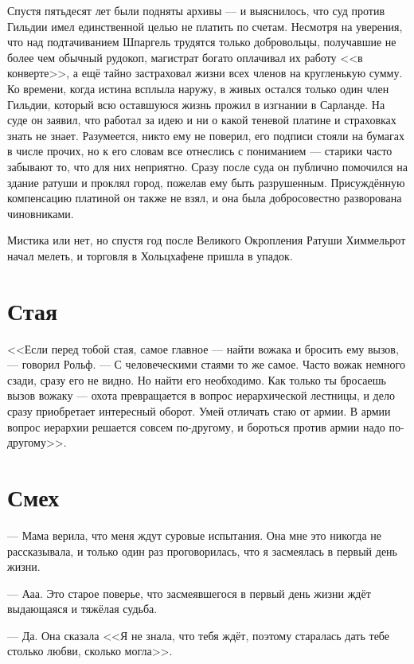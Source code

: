 Спустя пятьдесят лет были подняты архивы --- и выяснилось, что суд против Гильдии имел единственной целью не платить по счетам.
Несмотря на уверения, что над подтачиванием Шпаргель трудятся только добровольцы, получавшие не более чем обычный рудокоп, магистрат богато оплачивал их работу <<в конверте>>, а ещё тайно застраховал жизни всех членов на кругленькую сумму.
Ко времени, когда истина всплыла наружу, в живых остался только один член Гильдии, который всю оставшуюся жизнь прожил в изгнании в Сарланде.
На суде он заявил, что работал за идею и ни о какой теневой платине и страховках знать не знает.
Разумеется, никто ему не поверил, его подписи стояли на бумагах в числе прочих, но к его словам все отнеслись с пониманием --- старики часто забывают то, что для них неприятно.
Сразу после суда он публично помочился на здание ратуши и проклял город, пожелав ему быть разрушенным.
Присуждённую компенсацию платиной он также не взял, и она была добросовестно разворована чиновниками.

Мистика или нет, но спустя год после Великого Окропления Ратуши Химмельрот начал мелеть, и торговля в Хольцхафене пришла в упадок.

\section{Стая}

<<Если перед тобой стая, самое главное --- найти вожака и бросить ему вызов, --- говорил Рольф.
--- С человеческими стаями то же самое.
Часто вожак немного сзади, сразу его не видно.
Но найти его необходимо.
Как только ты бросаешь вызов вожаку --- охота превращается в вопрос иерархической лестницы, и дело сразу приобретает интересный оборот.
Умей отличать стаю от армии.
В армии вопрос иерархии решается совсем по-другому, и бороться против армии надо по-другому>>.

\section{Смех}

--- Мама верила, что меня ждут суровые испытания.
Она мне это никогда не рассказывала, и только один раз проговорилась, что я засмеялась в первый день жизни.

--- Ааа.
Это старое поверье, что засмеявшегося в первый день жизни ждёт выдающаяся и тяжёлая судьба.

--- Да.
Она сказала <<Я не знала, что тебя ждёт, поэтому старалась дать тебе столько любви, сколько могла>>.

